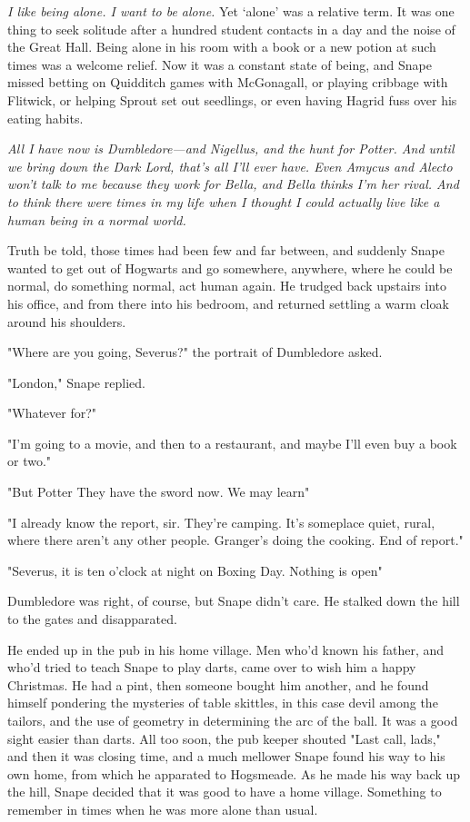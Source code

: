 \emph{I like being alone. I want to be alone.} Yet `alone' was a relative term. It was one thing to seek solitude after a hundred student contacts in a day and the noise of the Great Hall. Being alone in his room with a book or a new potion at such times was a welcome relief. Now it was a constant state of being, and Snape missed betting on Quidditch games with McGonagall, or playing cribbage with Flitwick, or helping Sprout set out seedlings, or even having Hagrid fuss over his eating habits.

\emph{All I have now is Dumbledore—and Nigellus, and the hunt for Potter. And until we bring down the Dark Lord, that's all I'll ever have. Even Amycus and Alecto won't talk to me because they work for Bella, and Bella thinks I'm her rival. And to think there were times in my life when I thought I could actually live like a human being in a normal world.}

Truth be told, those times had been few and far between, and suddenly Snape wanted to get out of Hogwarts and go somewhere, anywhere, where he could be normal, do something normal, act human again. He trudged back upstairs into his office, and from there into his bedroom, and returned settling a warm cloak around his shoulders.

"Where are you going, Severus?" the portrait of Dumbledore asked.

"London," Snape replied.

"Whatever for?"

"I'm going to a movie, and then to a restaurant, and maybe I'll even buy a book or two."

"But Potter{\el} They have the sword now. We may learn{\el}"

"I already know the report, sir. They're camping. It's someplace quiet, rural, where there aren't any other people. Granger's doing the cooking. End of report."

"Severus, it is ten o'clock at night on Boxing Day. Nothing is open{\el}"

Dumbledore was right, of course, but Snape didn't care. He stalked down the hill to the gates and disapparated.

He ended up in the pub in his home village. Men who'd known his father, and who'd tried to teach Snape to play darts, came over to wish him a happy Christmas. He had a pint, then someone bought him another, and he found himself pondering the mysteries of table skittles, in this case devil among the tailors, and the use of geometry in determining the arc of the ball. It was a good sight easier than darts. All too soon, the pub keeper shouted "Last call, lads," and then it was closing time, and a much mellower Snape found his way to his own home, from which he apparated to Hogsmeade. As he made his way back up the hill, Snape decided that it was good to have a home village. Something to remember in times when he was more alone than usual.

